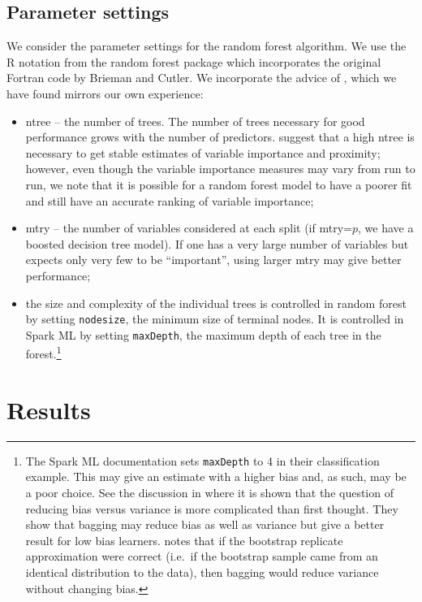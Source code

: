 \documentclass[a4paper]{amsart}
\begin{document}
\subsection{Parameter settings}
We consider the parameter settings for the random forest algorithm. We use the R notation from the random forest
package \cite{Liaw.and.Weiner.2002} which incorporates the original Fortran code by Brieman and Cutler.  We incorporate
the advice of \cite{Liaw.and.Weiner.2002}, which we have found mirrors our own experience:
\begin{itemize}
\item ntree  -- the number of trees.  The number of trees necessary for good performance grows with the number of
  predictors.  \cite{Liaw.and.Weiner.2002} suggest that a high ntree is necessary to get stable estimates of variable
  importance and proximity; however, even though the variable importance measures may vary from run to run, we note that
  it is possible for a random forest model to have a poorer fit and still have an accurate ranking of variable
  importance;
\item mtry  -- the number of variables considered at each split (if mtry=$p$, we have a boosted decision
  tree model).  If one has a very large number of variables but expects only very few to be ``important'', using larger mtry may give
  better performance;
\item the size and complexity of the individual trees is controlled in random forest by setting \texttt{nodesize}, the
  minimum size of terminal nodes. It is controlled in Spark ML by setting \texttt{maxDepth}, the maximum depth of each
  tree in the forest.\footnote{The Spark ML documentation \cite{Spark.2016} sets \texttt{maxDepth} to 4 in their
    classification example. This may give an estimate with a higher bias and, as such, may be a poor choice. See the
    discussion in \cite{Dietterich.2002} where it is shown that the question of reducing bias versus variance is more
    complicated than first thought. They show that bagging may reduce bias as well as variance but give a
    better result for low bias learners. \cite{Dietterich.2002} notes that if the bootstrap replicate approximation were
    correct (i.e.~if the bootstrap sample came from an identical distribution to the data), then bagging would reduce
    variance without changing bias.}
\end{itemize}


\section{Results}
\end{document}
